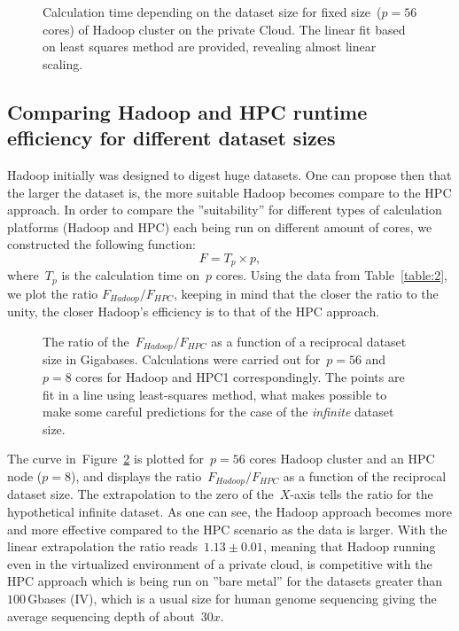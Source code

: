 \documentclass[11pt, oneside]{article}   	%
\begin{document}
\begin{figure}
	
	\caption{Calculation time depending on the dataset size for fixed size~($p=56$ cores) of Hadoop cluster on the private Cloud. The linear fit based on least squares method are provided, revealing almost linear scaling.}
	\label{fig:fig1}
\end{figure}


\subsection{Comparing Hadoop and HPC runtime efficiency for different dataset sizes}
Hadoop initially was designed to digest huge datasets\cite{hadoop,lin2010}. One can propose then that the larger the dataset is, the more suitable Hadoop becomes compare to the HPC approach. In order to compare the ''suitability'' for different types of calculation platforms (Hadoop and HPC) each being run on different amount of cores, we constructed the following function:
$$F=T_{p}\times p,$$ 
where~$T_{p}$ is the calculation time on~$p$ cores.
Using the data from Table~\ref{table:2},  we plot the ratio $F_{Hadoop}/F_{HPC}$, keeping in mind that the closer the ratio to the unity, the closer Hadoop's efficiency is to that of the HPC approach.


\begin{figure}
	
	\caption{The ratio of the~$F_{Hadoop}/F_{HPC}$ as a function of a reciprocal dataset size in Gigabases.  Calculations were carried out for~$p=56$ and $p=8$ cores for Hadoop and HPC1 correspondingly.
The points are fit in a line using least-squares method, what makes  possible to make some careful predictions for the case of the {\it infinite} dataset size.}
	\label{fig:fig2}
\end{figure}


The curve  in~Figure~\ref{fig:fig2} is plotted for~$p=56$ cores Hadoop cluster and an HPC node ($p=8$), and displays the ratio~$F_{Hadoop}/F_{HPC}$ as a function of the reciprocal dataset size. The extrapolation to the zero of the~$X$-axis tells the ratio for the hypothetical infinite dataset. As one can see, the Hadoop approach becomes more  and more effective compared to the HPC scenario as the data is larger. With  the linear extrapolation  the ratio reads~$1.13\pm0.01$, meaning that Hadoop running even  in the virtualized environment of a private cloud, is competitive with  the HPC approach which is being run on ''bare metal''  for the datasets greater than $100$\,Gbases (IV), which is a usual size for human genome sequencing giving the average sequencing depth of  about~$30x$.
\end{document}
